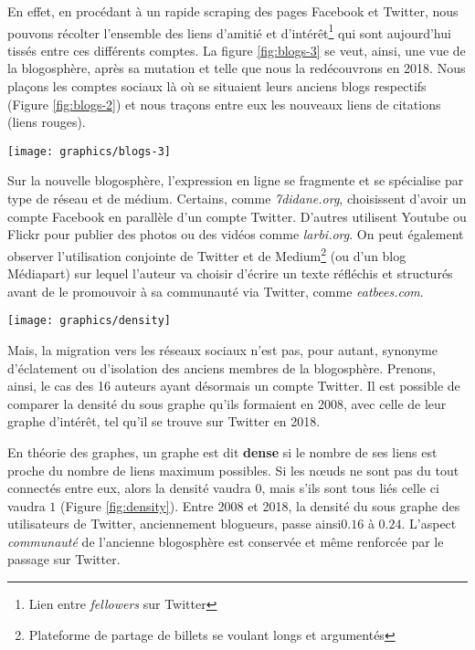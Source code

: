 \documentclass[symmetric,justified,marginals=raggedouter]{tufte-book}
\begin{document}
En effet, en procédant à un rapide scraping des pages Facebook et Twitter, nous pouvons récolter l'ensemble des liens d'amitié et d'intérêt\footnote{Lien entre \textit{fellowers} sur Twitter} qui sont aujourd'hui tissés entre ces différents comptes. La figure \ref{fig:blogs-3} se veut, ainsi, une vue de la blogosphère, après sa mutation et telle que nous la redécouvrons en 2018. Nous plaçons les comptes sociaux là où se situaient leurs anciens blogs respectifs (Figure \ref{fig:blogs-2}) et nous traçons entre eux les nouveaux liens de citations (liens rouges).

\newpage

\begin{figure*}
  \texttt{[image: graphics/blogs-3]}
  \caption{La blogosphère en 2018, les emplacements des blogs sont conservés}
  \label{fig:blogs-3}
\end{figure*} 

\noindent Sur la nouvelle blogosphère, l'expression en ligne se fragmente et se spécialise par type de réseau et de médium. Certains, comme \textit{7didane.org}, choisissent d'avoir un compte Facebook en parallèle d'un compte Twitter. D'autres utilisent Youtube ou Flickr pour publier des photos ou des vidéos comme \textit{larbi.org}. On peut également observer l'utilisation conjointe de Twitter et de Medium\footnote{Plateforme de partage de billets se voulant longs et argumentés} (ou d'un blog Médiapart) sur lequel l'auteur va choisir d'écrire un texte réfléchis et structurés avant de le promouvoir à sa communauté via Twitter, comme \textit{eatbees.com}. 

\begin{marginfigure}%
  \texttt{[image: graphics/density]}
  \vspace*{0.2cm}  
  \caption{Densité d'un graphe}
  \label{fig:density}
\end{marginfigure}

Mais, la migration vers les réseaux sociaux n'est pas, pour autant, synonyme d'éclatement ou d'isolation des anciens membres de la blogosphère. Prenons, ainsi, le cas des 16 auteurs ayant désormais un compte Twitter. Il est possible de comparer la densité du sous graphe qu'ils formaient en 2008, avec celle de leur graphe d'intérêt, tel qu'il se trouve sur Twitter en 2018. 

En théorie des graphes, un graphe est dit \textbf{dense} si le nombre de ses liens est proche du nombre de liens maximum possibles. Si les nœuds ne sont pas du tout connectés entre eux, alors la densité vaudra $0$, mais s'ils sont tous liés celle ci vaudra $1$ (Figure \ref{fig:density}). Entre 2008 et 2018, la densité du sous graphe des utilisateurs de Twitter, anciennement blogueurs, passe  ainsi$0.16$ à $0.24$. L'aspect \textit{communauté} de l'ancienne blogosphère est conservée et même renforcée par le passage sur Twitter.
\end{document}
